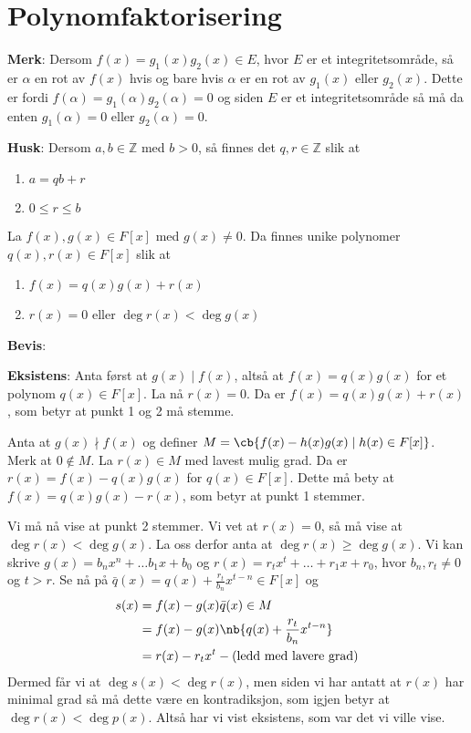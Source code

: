 \section{Polynomfaktorisering}
\textbf{Merk}: Dersom $f(x)=g_1(x)g_2(x)\in E$, hvor $E$ er et integritetsområde, så er $\alpha$ en rot
av $f(x)$ hvis og bare hvis $\alpha$ er en rot av $g_1(x)$ eller $g_2(x)$. Dette er fordi
$f(\alpha)=g_1(\alpha)g_2(\alpha)=0$ og siden $E$ er et integritetsområde så må da enten
$g_1(\alpha)=0$ eller $g_2(\alpha)=0$.

\textbf{Husk}: Dersom $a,b\in \mathbb{Z}$ med $b>0$, så finnes det $q,r\in \mathbb{Z}$ slik at
\begin{enumerate}
  \item $a=qb+r$
  \item $0\leq r\leq b$
\end{enumerate}

\begin{theorem*}{}{}
  La $f(x),g(x)\in F[x]$ med $g(x)\neq 0$. Da finnes unike polynomer $q(x), r(x)\in F[x]$ slik at
  \begin{enumerate}
    \item $f(x)=q(x)g(x)+r(x)$
    \item $r(x)=0$ eller $\deg r(x) < \deg g(x)$
  \end{enumerate}
\end{theorem*}

\textbf{Bevis}: 

\textbf{Eksistens}: Anta først at $g(x)\mid f(x)$, altså at $f(x)=q(x)g(x)$ for et polynom
$q(x)\in F[x]$. La nå $r(x)=0$. Da er $f(x)=q(x)g(x)+r(x)$, som betyr at punkt 1 og 2 må stemme.

Anta at $g(x)\nmid f(x)$ og definer $M=\cb{f(x)-h(x)g(x)\mid h(x)\in F[x]}$. Merk at $0\not\in M$.
La $r(x)\in M$ med lavest mulig grad. Da er $r(x)=f(x)-q(x)g(x)$ for $q(x)\in F[x]$. Dette må bety
at $f(x)=q(x)g(x)-r(x)$, som betyr at punkt 1 stemmer. 

Vi må nå vise at punkt 2 stemmer. Vi vet at $r(x)=0$, så må vise at $\deg r(x) < \deg g(x)$. La oss
derfor anta at $\deg r(x)\geq \deg g(x)$. Vi kan skrive $g(x)=b_nx^n + \dots b_1x + b_0$ og 
$r(x) = r_tx^t + \dots + r_1x + r_0$, hvor $b_n,r_t\neq 0$ og $t>r$. Se nå på 
$\bar{q}(x)=q(x) + \frac{r_t}{b_n}x^{t-n}\in F[x]$ og 
\begin{align}
  s(x) &= f(x) - g(x)\bar{q}(x)\in M \\
       &= f(x) - g(x) \nb{q(x) + \frac{r_t}{b_n}x^{t-n}} \\
       &= r(x) - r_tx^t - (\text{ledd med lavere grad})
\end{align}
Dermed får vi at $\deg s(x) < \deg r(x)$, men siden vi har antatt at $r(x)$ har minimal grad så
må dette være en kontradiksjon, som igjen betyr at $\deg r(x) < \deg p(x)$. Altså har vi vist
eksistens, som var det vi ville vise. 


